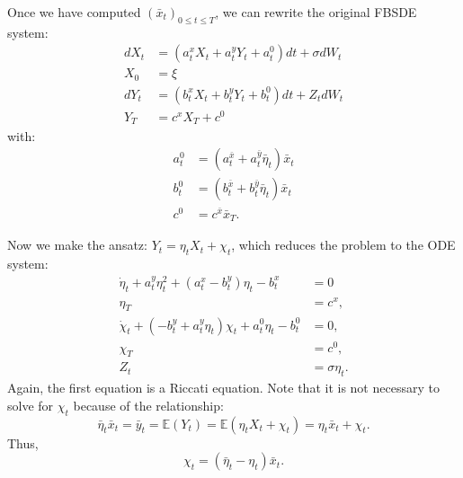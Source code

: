 \documentclass[11pt]{article}
\begin{document}
\begin{appendices}
Once we have computed $(\bar{x}_t)_{0\leq t\leq T}$, we can rewrite the original FBSDE system:
\begin{equation*}
\begin{split}
        dX_t&=\left(a^x_tX_t+a^y_tY_t+a^0_t\right)dt+\sigma dW_t \\
        X_0&=\xi \\
        dY_t&=\left(b^x_tX_t+b^y_tY_t+b^0_t\right)dt +Z_t dW_t \\
        Y_T&=c^xX_T+c^0
\end{split}
\end{equation*}
with:
\begin{equation*}
\begin{split}
    a^0_t&=(a^{\bar{x}}_t+a^{\bar{y}}_t \bar{\eta}_t)\bar{x}_t \\
    b^0_t&=(b^{\bar{x}}_t+b^{\bar{y}}_t \bar{\eta}_t)\bar{x}_t\\
    c^0&=c^{\bar{x}}\bar{x}_T.
\end{split}
\end{equation*}

Now we make the ansatz: $Y_t=\eta_t X_t+\chi_t$, which reduces the problem to the ODE system:
\begin{equation*}
\begin{split}
    \dot{\eta}_t+a^y_t\eta_t^2+(a^x_t-b^y_t)\eta_t-b^x_t&=0 \\
    \eta_T&=c^x, \\
    \dot{\chi}_t+(-b^y_t+a^y_t\eta_t)\chi_t+a^0_t\eta_t-b^0_t&=0, \\
    \chi_T&=c^0, \\
    Z_t&=\sigma \eta_t.
\end{split}
\end{equation*}
Again, the first equation is a Riccati equation. Note that it is not necessary to solve for $\chi_t$ because of the relationship:
\begin{equation*}
    \bar{\eta}_t\bar{x}_t=\bar{y}_t=\mathbb{E}(Y_t)=\mathbb{E}(\eta_t X_t+\chi_t)=\eta_t \bar{x}_t+\chi_t.
\end{equation*}
Thus,
\begin{equation*}
    \chi_t=(\bar{\eta}_t-\eta_t)\bar{x}_t.
\end{equation*}


\end{appendices}
\end{document}
